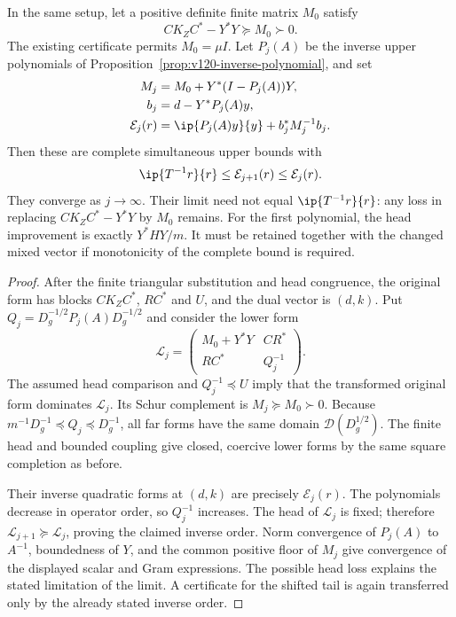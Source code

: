 \begin{proposition}
\label{prop:v123-monotone-head}
In the same setup, let a positive definite finite matrix $M_0$
satisfy
\[
 C K_Z C^*-Y^*Y\succeq M_0\succ0.
\]
The existing certificate permits $M_0=\mu I$. Let $P_j(A)$
be the inverse upper polynomials of
Proposition~\ref{prop:v120-inverse-polynomial}, and set
\begin{align*}
 M_j&=M_0+Y^*(I-P_j(A))Y,\\
 b_j&=d-Y^*P_j(A)y,\\
 \mathcal E_j(r)&=\ip{P_j(A)y}{y}+b_j^*M_j^{-1}b_j.
\end{align*}
Then these are complete simultaneous upper bounds with
\begin{equation}\label{eq:v123-monotone-head}
 \ip{T^{-1}r}{r}\le\mathcal E_{j+1}(r)
          \le\mathcal E_j(r).
\end{equation}
They converge as $j\to\infty$. Their limit need not equal
$\ip{T^{-1}r}{r}$: any loss in replacing
$CK_ZC^*-Y^*Y$ by $M_0$ remains.
For the first polynomial, the head improvement is exactly
$Y^*HY/m$. It must be retained together with the changed
mixed vector if monotonicity of the complete bound is required.
\end{proposition}
\begin{proof}
After the finite triangular substitution and head congruence,
the original form has blocks $CK_ZC^*$, $RC^*$ and $U$,
and the dual vector is $(d,k)$. Put
$Q_j=D_g^{-1/2}P_j(A)D_g^{-1/2}$ and consider the lower form
\[
 \mathcal L_j=
 \begin{pmatrix}
 M_0+Y^*Y & CR^*\\
 RC^* & Q_j^{-1}
 \end{pmatrix}.
\]
The assumed head comparison and $Q_j^{-1}\preceq U$ imply
that the transformed original form dominates $\mathcal L_j$.
Its Schur complement is $M_j\succeq M_0\succ0$.
Because $m^{-1}D_g^{-1}\preceq Q_j\preceq D_g^{-1}$,
all far forms have the same domain $\mathcal D(D_g^{1/2})$.
The finite head and bounded coupling give closed, coercive
lower forms by the same square completion as before.

Their inverse quadratic forms at $(d,k)$ are precisely
$\mathcal E_j(r)$. The polynomials decrease in operator order,
so $Q_j^{-1}$ increases. The head of $\mathcal L_j$ is fixed;
therefore $\mathcal L_{j+1}\succeq\mathcal L_j$, proving the
claimed inverse order. Norm convergence of $P_j(A)$ to $A^{-1}$,
boundedness of $Y$, and the common positive floor of $M_j$
give convergence of the displayed scalar and Gram expressions.
The possible head loss explains the stated limitation of the
limit. A certificate for the shifted tail is again transferred
only by the already stated inverse order.
\end{proof}

